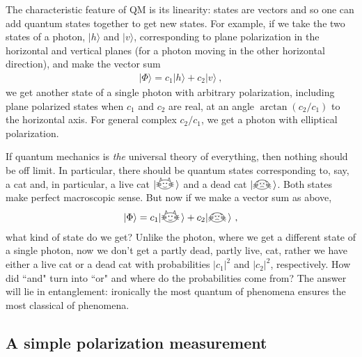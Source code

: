 \documentclass[12pt]{article}
\theoremstyle{plain}
\theoremstyle{definition}
\theoremstyle{remark}
\def\ket#1{| #1\rangle}
\def\LCATH{\raisebox{-2pt}{\begin{tikzpicture}[scale=0.14]
\draw (0,0) ellipse (1.8cm and 1.2cm);
\draw [-] (1,0) -- (2.3,0);
\draw [-] (-1,0) -- (-2.3,0);
\draw [-] (1,-0.2) -- (2.2,-0.5);
\draw [-] (-1,-0.2) -- (-2.2,-0.5);
\draw [-] (1,0.2) -- (2.2,0.5);
\draw [-] (-1,0.2) -- (-2.2,0.5);
\filldraw[black] (0.4,0.3) circle (0.1cm);
\filldraw[black] (-0.4,0.3) circle (0.1cm);
\draw[-] (-0.5,-0.6) to[out=-30,in=210] (0.5,-0.6);
\draw[-] (0.8,1.1) -- (1.1,1.8) -- (1.4,0.8);
\draw[-] (-0.8,1.1) -- (-1.1,1.8) -- (-1.4,0.8);
\end{tikzpicture}
}\!}
\def\DCATH{\raisebox{-2pt}{\begin{tikzpicture}[scale=0.14]
\draw (0,0) ellipse (1.8cm and 1.2cm);
\draw [-] (1,0) -- (2.3,-0.5);
\draw [-] (-1,0) -- (-2.3,-0.5);
\draw [-] (1,-0.2) -- (2.2,-1);
\draw [-] (-1,-0.2) -- (-2.2,-1);
\draw [-] (1,0.2) -- (2.2,0);
\draw [-] (-1,0.2) -- (-2.2,0);
\draw[-] (0.2,0.1) -- (0.6,0.5);
\draw[-] (0.2,0.5) -- (0.6,0.1);
\draw[-] (-0.2,0.1) -- (-0.6,0.5);
\draw[-] (-0.2,0.5) -- (-0.6,0.1);
\draw[-]  (-0.5,-0.6) to[out=30,in=150] (0.5,-0.6);
\draw[-] (0.8,1.1) -- (1.1,0.6) -- (1.4,0.8);
\draw[-] (-0.8,1.1) -- (-1.1,0.6) -- (-1.4,0.8);
\end{tikzpicture}
}\!}
\newcommand{\EQ}[1]{\begin{equation}\begin{split} #1
\end{split}\end{equation}}
\begin{document}
The characteristic feature of QM is its linearity: states are vectors and so one can add quantum states together to get new states. For example, if we take the two states of a photon, $\ket{h}$ and $\ket{v}$, corresponding to plane polarization in the horizontal and vertical planes (for a photon moving in the other horizontal direction), and make the vector sum
\EQ{
\ket{\Phi}=c_1\ket{h}+c_2\ket{v}\ ,
\label{rnn}
}
we get another state of a single photon with arbitrary polarization, including plane polarized states when $c_1$ and $c_2$ are real, at an angle $\arctan(c_2/c_1)$ to the horizontal axis. For general complex $c_2/c_1$, we get a photon with elliptical polarization.

If quantum mechanics is {\it the\/} universal theory of everything, then nothing should be off limit. In particular, there should  be quantum states corresponding to, say, a cat and, in particular, a live cat $\ket{\LCATH}$ and a dead cat $\ket{\DCATH}$. Both states make perfect macroscopic sense. But now if we make a vector sum as above,
\EQ{
\ket{\Phi}=c_1\ket{\LCATH}+c_2\ket{\DCATH}\ ,
\label{scs}
}
what kind of state do we get? Unlike the photon, where we get a different state of a single photon, now we don't get a partly dead, partly live, cat, rather we have either a live cat or a dead cat with probabilities $|c_1|^2$ and $|c_2|^2$, respectively. How did ``and" turn into ``or" and where do the probabilities come from? The answer will lie in entanglement: ironically the most quantum of phenomena ensures the most classical of phenomena.

\subsection{A simple polarization measurement}\label{s2.0}
\end{document}
